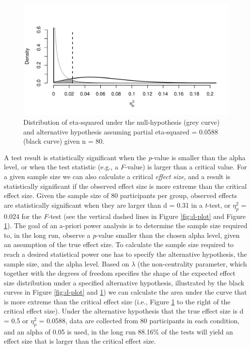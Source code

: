 \documentclass[
  ,jou,floatsintext]{apa6}
\begin{document}
\begin{figure}
\centering
\includegraphics{0.1_Simulation_Based_Power_Analysis_For_Factorial_ANOVA_Designs_files/figure-latex/eta-plot-1.pdf}
\caption{\label{fig:eta-plot}Distribution of eta-squared under the null-hypothesis (grey curve) and alternative hypothesis assuming partial eta-squared = 0.0588 (black curve) given n = 80.}
\end{figure}

A test result is statistically significant when the \emph{p}-value is smaller than the alpha level, or when the test statistic (e.g., a \emph{F}-value) is larger than a critical value.
For a given sample size we can also calculate a critical \emph{effect size}, and a result is statistically significant if the observed effect size is more extreme than the critical effect size.
Given the sample size of 80 participants per group, observed effects are statistically significant when they are larger than d = 0.31 in a \emph{t}-test, or \(\eta_p^2\) = 0.024 for the \emph{F}-test (see the vertical dashed lines in Figure \ref{fig:d-plot} and Figure \ref{fig:eta-plot}).
The goal of an a-priori power analysis is to determine the sample size required to, in the long run, observe a \emph{p}-value smaller than the chosen alpha level, given an assumption of the true effect size.
To calculate the sample size required to reach a desired statistical power one has to specify the alternative hypothesis, the sample size, and the alpha level.
Based on \(\lambda\) (the non-centrality parameter, which together with the degrees of freedom specifies the shape of the expected effect size distribution under a specified alternative hypothesis, illustrated by the black curves in Figure \ref{fig:d-plot} and \ref{fig:eta-plot}) we can calculate the area under the curve that is more extreme than the critical effect size (i.e., Figure \ref{fig:eta-plot} to the right of the critical effect size).
Under the alternative hypothesis that the true effect size is d = 0.5 or \(\eta_p^2\) = 0.0588, data are collected from 80 participants in each condition, and an alpha of 0.05 is used, in the long run 88.16\% of the tests will yield an effect size that is larger than the critical effect size.
\end{document}
